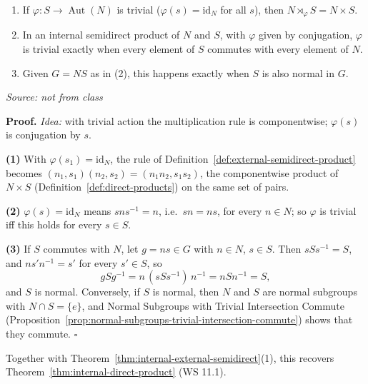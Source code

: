 \documentclass[11pt]{report}
\renewenvironment{proof}[1][Proof]{\noindent\textbf{#1.} }{\hfill$\square$\par\vspace{5pt}}
\newcommand{\srcline}[1]{\par\hfill{\footnotesize\textit{Source: #1}}}
\begin{document}
\begin{propbox}\label{prop:semidirect-trivial-action-direct}
\begin{enumerate}
    \item If $\varphi: S \to \operatorname{Aut}(N)$ is trivial ($\varphi(s) = \mathrm{id}_N$ for all $s$), then $N \rtimes_\varphi S = N \times S$.
    \item In an internal semidirect product of $N$ and $S$, with $\varphi$ given by conjugation, $\varphi$ is trivial exactly when every element of $S$ commutes with every element of $N$.
    \item Given $G = NS$ as in (2), this happens exactly when $S$ is also normal in $G$.
\end{enumerate}
\srcline{not from class}
\end{propbox}

\begin{proof}
\textit{Idea:} with trivial action the multiplication rule is componentwise; $\varphi(s)$ is conjugation by $s$.\par
\textbf{(1)} With $\varphi(s_1) = \mathrm{id}_N$, the rule of Definition~\ref{def:external-semidirect-product} becomes $(n_1, s_1)(n_2, s_2) = (n_1n_2, s_1s_2)$, the componentwise product of $N \times S$ (Definition~\ref{def:direct-products}) on the same set of pairs.

\textbf{(2)} $\varphi(s) = \mathrm{id}_N$ means $sns^{-1} = n$, i.e.\ $sn = ns$, for every $n \in N$; so $\varphi$ is trivial iff this holds for every $s \in S$.

\textbf{(3)} If $S$ commutes with $N$, let $g = ns \in G$ with $n \in N$, $s \in S$. Then $sSs^{-1} = S$, and $ns'n^{-1} = s'$ for every $s' \in S$, so
\[ gSg^{-1} = n\,(sSs^{-1})\,n^{-1} = nSn^{-1} = S, \]
and $S$ is normal. Conversely, if $S$ is normal, then $N$ and $S$ are normal subgroups with $N \cap S = \{e\}$, and Normal Subgroups with Trivial Intersection Commute (Proposition~\ref{prop:normal-subgroups-trivial-intersection-commute}) shows that they commute.
\end{proof}

Together with Theorem~\ref{thm:internal-external-semidirect}(1), this recovers Theorem~\ref{thm:internal-direct-product} (WS 11.1).
\end{document}

